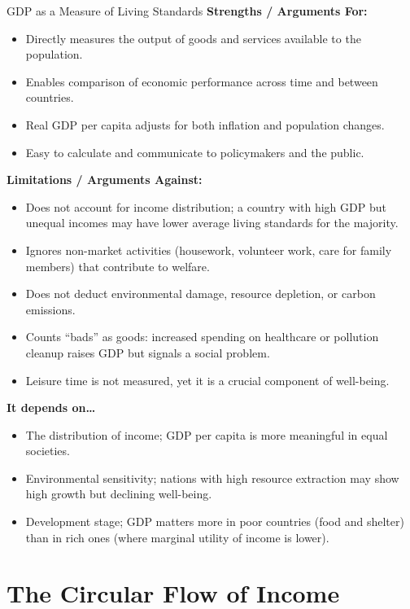 \documentclass[11pt, a4paper, twoside]{book}
\begin{document}
\begin{evaluation}{GDP as a Measure of Living Standards}
\textbf{Strengths / Arguments For:}
\begin{itemize}[leftmargin=*, nosep]
\item Directly measures the output of goods and services available to the population.
\item Enables comparison of economic performance across time and between countries.
\item Real GDP per capita adjusts for both inflation and population changes.
\item Easy to calculate and communicate to policymakers and the public.
\end{itemize}
\textbf{Limitations / Arguments Against:}
\begin{itemize}[leftmargin=*, nosep]
\item Does not account for income distribution; a country with high GDP but unequal incomes may have lower average living standards for the majority.
\item Ignores non-market activities (housework, volunteer work, care for family members) that contribute to welfare.
\item Does not deduct environmental damage, resource depletion, or carbon emissions.
\item Counts ``bads'' as goods: increased spending on healthcare or pollution cleanup raises GDP but signals a social problem.
\item Leisure time is not measured, yet it is a crucial component of well-being.
\end{itemize}
\textbf{It depends on\ldots}
\begin{itemize}[leftmargin=*, nosep]
\item The distribution of income; GDP per capita is more meaningful in equal societies.
\item Environmental sensitivity; nations with high resource extraction may show high growth but declining well-being.
\item Development stage; GDP matters more in poor countries (food and shelter) than in rich ones (where marginal utility of income is lower).
\end{itemize}
\end{evaluation}

\section{The Circular Flow of Income}
\end{document}
